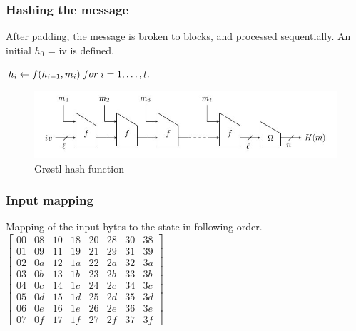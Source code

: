 \documentclass{beamer}
\begin{document}
\begin{frame}
\frametitle{Hashing the message}
After padding, the message is broken to blocks, and processed sequentially. An initial $h_{0}$ = iv is defined.
\begin{center}$ h_{i}\gets f(h_{i-1}, m_{i})\thickspace for \thickspace i = 1,\ldots, t.$\end{center}
\begin{figure}
  \begin{center}
    \includegraphics[scale=0.5]{groestlhashfunction.jpg}
  \end{center}
  \caption{Gr{\o}stl hash function \footnotemark}
  \label{fig:lab}
\end{figure}
\end{frame}

\begin{frame}
\frametitle{Input mapping}
Mapping of the input bytes to the state in following order. \\
\vspace{3mm}
$\begin{bmatrix}
  00 & 08 & 10 & 18 & 20 & 28 & 30 & 38 \\
  01 & 09 & 11 & 19 & 21 & 29 & 31 & 39 \\
  02 & 0a & 12 & 1a & 22 & 2a & 32 & 3a \\
  03 & 0b & 13 & 1b & 23 & 2b & 33 & 3b \\
  04 & 0c & 14 & 1c & 24 & 2c & 34 & 3c \\
  05 & 0d & 15 & 1d & 25 & 2d & 35 & 3d \\
  06 & 0e & 16 & 1e & 26 & 2e & 36 & 3e \\
  07 & 0f & 17 & 1f & 27 & 2f & 37 & 3f
\end{bmatrix}$
\end{frame}
\end{document}
